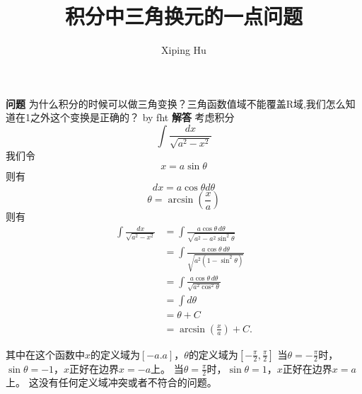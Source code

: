 \documentclass{article}
\author{Xiping Hu}
\title{积分中三角换元的一点问题}
\begin{document}
\maketitle
\noindent \textbf{问题} \quad 为什么积分的时候可以做三角变换？三角函数值域不能覆盖R域,我们怎么知道在1之外这个变换是正确的？ by fht
\vspace{1cm}
\newline
\noindent 
\textbf{解答}\quad
考虑积分
\begin{equation}
  \label{}
\int {\frac {dx}{\sqrt {a^{2}-x^{2}}}}
\end{equation}
我们令
\begin{equation}
  \label{}
x = a \sin \theta
\end{equation}
则有
\begin{equation}
  \label{}
dx=a\cos \theta d \theta 
\end{equation}
\begin{equation}
  \label{}
\theta = \arcsin \left( \frac{x}{a} \right )
\end{equation}
则有
\begin{equation}
  \label{}
\begin{aligned}\int {\frac {dx}{\sqrt {a^{2}-x^{2}}}}&=\int {\frac {a\cos \theta \,d\theta }{\sqrt {a^{2}-a^{2}\sin ^{2}\theta }}}\\&=\int {\frac {a\cos \theta \,d\theta }{\sqrt {a^{2}(1-\sin ^{2}\theta )}}}\\&=\int {\frac {a\cos \theta \,d\theta }{\sqrt {a^{2}\cos ^{2}\theta }}}\\&=\int d\theta \\&=\theta +C\\&=\arcsin \left({\frac {x}{a}}\right)+C.\end{aligned}
\end{equation}
\par 其中在这个函数中$x$的定义域为$[-a.a]$，$\theta$的定义域为$[-\frac{\pi}{2} , \frac{\pi}{2}]$
当$\theta = -\frac{\pi}{2}$时，$\sin \theta=-1$，$x$正好在边界$x=-a$上。
当$\theta = \frac{\pi}{2}$时，$\sin \theta=1$，$x$正好在边界$x=a$上。
这没有任何定义域冲突或者不符合的问题。
\end{document}
